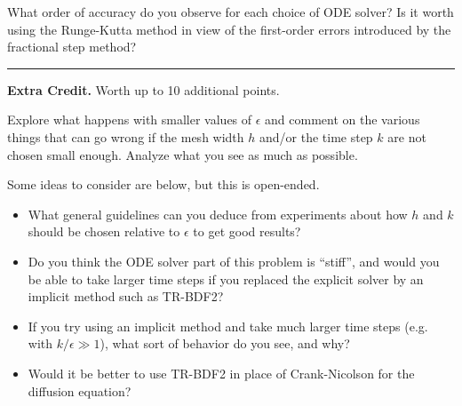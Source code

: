 \documentclass[10pt]{article}
\begin{document}
What order of accuracy do you observe for each choice of ODE solver?
Is it worth using the Runge-Kutta method in view of the first-order errors
introduced by the fractional step method?





\vskip 1cm
\hrule
{\bf Extra Credit.}  Worth up to 10 additional points.

Explore what happens
with smaller values of $\epsilon$ and comment on the various
things that can go wrong if the mesh width $h$ and/or the time step $k$ are
not chosen small enough.  Analyze what you see as much as possible.

Some ideas to consider are below, but this is open-ended.
\begin{itemize} 
\item What general guidelines can you deduce from experiments about how $h$
and $k$ should be chosen relative to $\epsilon$ to get good results?

\item Do you think the ODE solver part of this problem is ``stiff'', and
would you be able to take larger time steps if you replaced the explicit
solver by an implicit method such as TR-BDF2?  

\item If you try using an implicit method and take much larger time steps (e.g.
with $k/\epsilon \gg 1$), what sort of behavior do you see, and why?

\item Would it be better to use TR-BDF2 in place of Crank-Nicolson for the
diffusion equation?
\end{itemize}  



\end{document}
